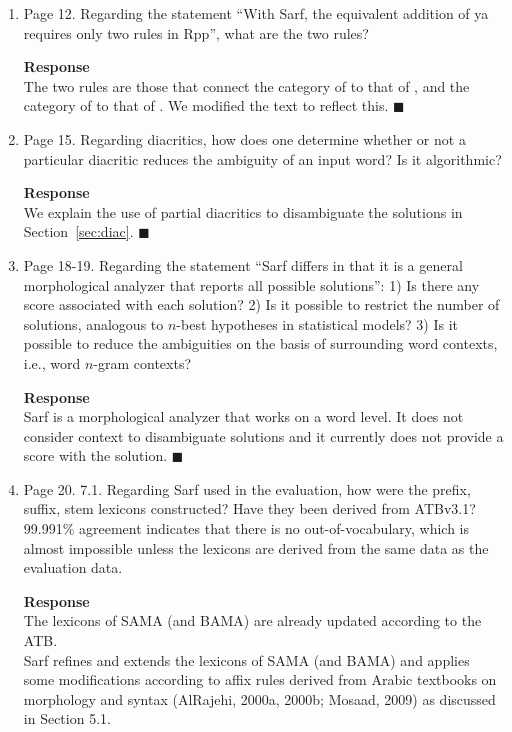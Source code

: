 \begin{enumerate}[leftmargin=0mm,label=\bfseries CommentR1.\arabic*]
\item\label{Review.1.10}
Page 12.  Regarding the statement ``With Sarf, the equivalent addition of ya requires only two rules in Rpp'',   what are the two rules?

\textbf{Response}\\
The two rules are those that connect the category of  to that of , and the category of  to that of . 
We modified the text to reflect this. 
$\blacksquare$

\item\label{Review.1.11}
Page 15.  Regarding diacritics, how does one determine whether or not a particular diacritic reduces the ambiguity of an input word? 
Is it algorithmic?

\textbf{Response}\\
We explain the use of partial diacritics to disambiguate the solutions in Section~\ref{sec:diac}. 
$\blacksquare$

\item\label{Review.1.12}
Page 18-19.  Regarding the statement ``Sarf differs in that it is a general morphological analyzer that reports all possible solutions'': 1) Is there any score associated with each solution? 2) Is it possible to restrict the number of solutions, analogous to $n$-best hypotheses in statistical models? 3) Is it possible to reduce the ambiguities on the basis of surrounding word contexts, i.e., word $n$-gram contexts?

\textbf{Response}\\
Sarf is a morphological analyzer that works on a word level. It does not consider context to disambiguate solutions and it currently does not 
provide a score with the solution.
$\blacksquare$

\item\label{Review.1.13}
Page 20.  7.1. Regarding Sarf used in the evaluation, how were the prefix, suffix, stem lexicons constructed? Have they been derived from ATBv3.1? 99.991\% agreement indicates that there is no out-of-vocabulary, which is almost impossible unless the lexicons are derived from the same data as the evaluation data.

\textbf{Response}\\
The lexicons of SAMA (and BAMA) are already updated according to the ATB.\\
Sarf refines and extends the lexicons of SAMA (and BAMA) and applies some modifications according to affix rules derived from Arabic textbooks on morphology and syntax (AlRajehi, 2000a, 2000b; Mosaad, 2009) as discussed in Section 5.1.
  

\end{enumerate}
